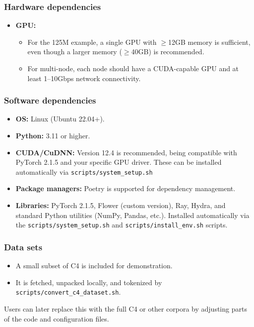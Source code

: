 \documentclass{sigplanconf}
\begin{document}
\subsubsection{Hardware dependencies}
\begin{itemize}
  \item \textbf{GPU:}
    \begin{itemize}
      \item For the 125M example, a single GPU with \(\geq\)12GB memory is sufficient, even though a larger memory (\(\geq\)40GB) is recommended.
      \item For multi-node, each node should have a CUDA-capable GPU and at least 1--10Gbps network connectivity.
    \end{itemize}
\end{itemize}

\subsubsection{Software dependencies}
\begin{itemize}
  \item \textbf{OS:} Linux (Ubuntu 22.04+).
  \item \textbf{Python:} 3.11 or higher.
  \item \textbf{CUDA/CuDNN:} Version 12.4 is recommended, being compatible with PyTorch 2.1.5 and your specific GPU driver. These can be installed automatically via \texttt{scripts/system\_setup.sh}
  \item \textbf{Package managers:} Poetry is supported for dependency management.
  \item \textbf{Libraries:} PyTorch 2.1.5, Flower (custom version), Ray, Hydra, and standard Python utilities (NumPy, Pandas, etc.). Installed automatically via the \texttt{scripts/system\_setup.sh} and \texttt{scripts/install\_env.sh} scripts.
\end{itemize}

\subsubsection{Data sets}
\begin{itemize}
  \item A small subset of C4 is included for demonstration.
  \item It is fetched, unpacked locally, and tokenized by\\ \texttt{scripts/convert\_c4\_dataset.sh}.
\end{itemize}
Users can later replace this with the full C4 or other corpora by adjusting parts of the code and configuration files.
\end{document}

